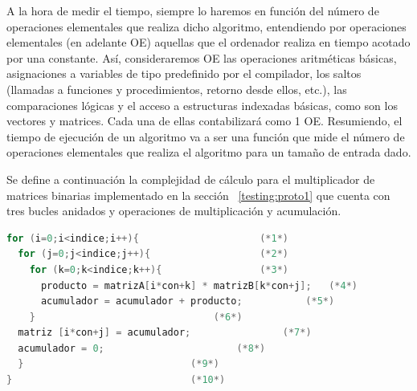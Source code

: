  		A la hora de medir el tiempo, siempre lo haremos en función del número de operaciones elementales que realiza dicho algoritmo, entendiendo por
 		operaciones elementales (en adelante OE) aquellas que el ordenador realiza en tiempo acotado por una constante. Así, consideraremos OE las
 		operaciones aritméticas básicas,  asignaciones a variables de tipo predefinido por el compilador, los saltos (llamadas a funciones y
 		procedimientos, retorno desde ellos, etc.), las comparaciones lógicas y el acceso a estructuras indexadas básicas, como son los vectores y
 		matrices. Cada una de ellas contabilizará como 1 OE. Resumiendo, el tiempo de ejecución de un algoritmo va a ser una función que mide el número de
 		operaciones elementales que realiza el algoritmo para un tamaño de entrada dado.
		
		Se define a continuación la complejidad de cálculo para el multiplicador de matrices binarias implementado en la sección ~\ref {testing:proto1} que
		cuenta con tres bucles anidados y operaciones de multiplicación y acumulación.
	
\newpage			
	\begin{lstlisting}[language=C,frame=single]
for (i=0;i<indice;i++){						(*1*)
  for (j=0;j<indice;j++){					(*2*)
    for (k=0;k<indice;k++){					(*3*)
	  producto = matrizA[i*con+k] * matrizB[k*con+j];	(*4*)
	  acumulador = acumulador + producto;			(*5*) 
    }								(*6*)
  matriz [i*con+j] = acumulador;				(*7*)
  acumulador = 0;						(*8*)
  }								(*9*)
}								(*10*)
	\end{lstlisting}
		
